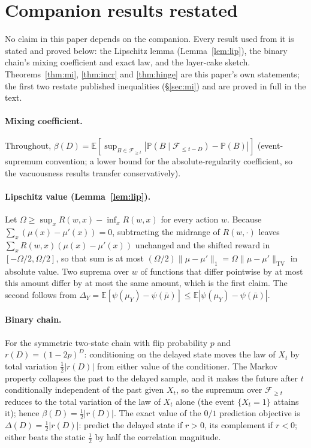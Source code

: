 \documentclass[acmsmall,screen,review,anonymous]{acmart}
\newcommand{\TV}{\mathrm{TV}}
\newcommand{\E}{\mathbb{E}}
\begin{document}
\appendix
\section{Companion results restated}\label{app:companion}

No claim in this paper depends on the companion. Every result used from it
is stated and proved below: the Lipschitz lemma (Lemma~\ref{lem:lip}), the
binary chain's mixing coefficient and exact law, and the layer-cake sketch.
Theorems~\ref{thm:mi}, \ref{thm:incr} and \ref{thm:hinge} are this paper's own
statements; the first two restate published inequalities (\S\ref{sec:mi})
and are proved in full in the text.

\paragraph{Mixing coefficient.} Throughout,
$\beta(D)=\E[\sup_{B\in\mathcal F_{\ge t}}
|\mathbb P(B\mid\mathcal F_{\le t-D})-\mathbb P(B)|]$ (event-supremum
convention; a lower bound for the absolute-regularity coefficient, so the
vacuousness results transfer conservatively).

\paragraph{Lipschitz value (Lemma~\ref{lem:lip}).} Let $\Omega\ge\sup_x R(w,x)-\inf_x R(w,x)$ for
every action $w$. Because $\sum_x(\mu(x)-\mu'(x))=0$, subtracting the midrange
of $R(w,\cdot)$ leaves $\sum_x R(w,x)(\mu(x)-\mu'(x))$ unchanged and the
shifted reward in $[-\Omega/2,\Omega/2]$, so that sum is at most
$(\Omega/2)\|\mu-\mu'\|_1=\Omega\|\mu-\mu'\|_{\TV}$ in absolute value. Two
suprema over $w$ of functions that differ pointwise by at most this amount
differ by at most the same amount, which is the first claim. The second
follows from $\Delta_Y=\E[\psi(\mu_Y)-\psi(\bar\mu)]\le\E|\psi(\mu_Y)-\psi(\bar\mu)|$.

\paragraph{Binary chain.} For the symmetric two-state chain with flip
probability $p$ and $r(D)=(1-2p)^D$: conditioning on the delayed state
moves the law of $X_t$ by total variation $\tfrac12|r(D)|$ from either
value of the conditioner. The Markov property collapses the past to the
delayed sample, and it makes the future after $t$ conditionally independent
of the past given $X_t$, so the supremum over $\mathcal F_{\ge t}$
reduces to the total variation of the law of $X_t$ alone (the event
$\{X_t=1\}$ attains it); hence $\beta(D)=\tfrac12|r(D)|$. The exact value of the
$0/1$ prediction objective is $\Delta(D)=\tfrac12|r(D)|$: predict the
delayed state if $r>0$, its complement if $r<0$; either beats the static
$\tfrac12$ by half the correlation magnitude.
\end{document}
